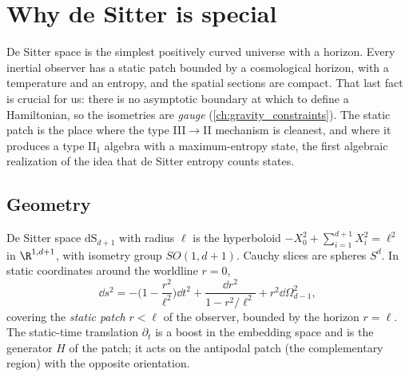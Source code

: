 \chapter{Why de Sitter is special}\label{ch:ds_special}

\begin{physmotiv}
De Sitter space is the simplest positively curved universe with a horizon. Every inertial observer has a static patch bounded by a cosmological horizon, with a temperature and an entropy, and the spatial sections are compact. That last fact is crucial for us: there is no asymptotic boundary at which to define a Hamiltonian, so the isometries are \emph{gauge} (\cref{ch:gravity_constraints}). The static patch is the place where the type III$\to$II mechanism is cleanest, and where it produces a type II$_1$ algebra with a maximum-entropy state, the first algebraic realization of the idea that de Sitter entropy counts states.
\end{physmotiv}

\section{Geometry}

De Sitter space $\mathrm{dS}_{d+1}$ with radius $\ell$ is the hyperboloid $-X_0^2+\sum_{i=1}^{d+1}X_i^2=\ell^2$ in $\R^{1,d+1}$, with isometry group $SO(1,d+1)$. Cauchy slices are spheres $S^d$. In static coordinates around the worldline $r=0$,
\begin{equation}
\dd s^2=-\Big(1-\frac{r^2}{\ell^2}\Big)\dd t^2+\frac{\dd r^2}{1-r^2/\ell^2}+r^2\dd\Omega_{d-1}^2,
\end{equation}
covering the \emph{static patch} $r<\ell$ of the observer, bounded by the horizon $r=\ell$. The static-time translation $\partial_t$ is a boost in the embedding space and is the generator $H$ of the patch; it acts on the antipodal patch (the complementary region) with the opposite orientation.

\begin{center}
\end{center}

